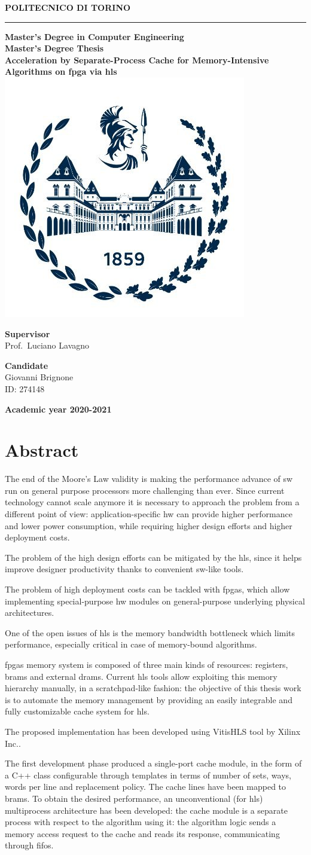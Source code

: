 \documentclass[11pt,a4paper,oneside]{memoir}
\renewcommand*{\maketitle}%
{
	\newgeometry{left=2cm,right=2cm,top=3cm,bottom=3.5cm}

	\begin{center}
		\begingroup
		{\Huge\textbf{POLITECNICO DI TORINO}}\\[\baselineskip]
		\rule{\textwidth}{2pt}\par
		\vspace*{1em}
		{\LARGE\textbf{Master's Degree in Computer Engineering}}\\[\baselineskip]
		\vspace*{1em}
		{\Large\textbf{Master's Degree Thesis}}\\
		\vspace*{2cm}
		{\huge\textbf{Acceleration by Separate-Process Cache for
		Memory-Intensive Algorithms on \acs{fpga} via \acl{hls}}}\\
		\vspace*{1cm}
		\includegraphics[width=.3\textwidth]{figures/polito-logo}
	\end{center}
	\vfill
	\begin{minipage}{0.4\textwidth}
		\begin{flushleft}
			{\Large
				\textbf{Supervisor}\\
				Prof.\ Luciano Lavagno
			}
		\end{flushleft}
	\end{minipage}
	\begin{minipage}{0.4\textwidth}
		\begin{flushright} 
			{\Large
				\textbf{Candidate}\\
				Giovanni Brignone\\
				ID: 274148
			}
		\end{flushright}
	\end{minipage}  
	\vspace*{2cm}
	\begin{center}
		{\Large\textbf{Academic year 2020-2021}}
	\end{center}
	\endgroup

	\restoregeometry 
}
\begin{document}
\pagestyle{empty}
\maketitle

\clearpage
\pagestyle{plain}

\frontmatter
\chapter*{Abstract}
The end of the Moore's Law validity is making the performance advance of
\acl{sw} run on general purpose processors more challenging than ever.
Since current technology cannot scale anymore it is necessary to approach the
problem from a different point of view: application-specific \acl{hw} can
provide higher performance and lower power consumption, while requiring higher
design efforts and higher deployment costs.

The problem of the high design efforts can be mitigated by the \acf{hls}, since
it helps improve designer productivity thanks to convenient \acl{sw}-like
tools.

The problem of high deployment costs can be tackled with \acp{fpga}, which allow
implementing special-purpose \acl{hw} modules on general-purpose underlying
physical architectures.

\bigskip
One of the open issues of \ac{hls} is the memory bandwidth bottleneck which
limits performance, especially critical in case of memory-bound algorithms.

\acp{fpga} memory system is composed of three main kinds of resources: registers,
\aclp{bram} and external \acsp{dram}.
Current \ac{hls} tools allow exploiting this memory hierarchy manually, in a
scratchpad-like fashion: the objective of this thesis work is to automate the
memory management by providing an easily integrable and fully customizable cache
system for \ac{hls}.

\bigskip
The proposed implementation has been developed using Vitis\texttrademark HLS
tool by Xilinx Inc..

The first development phase produced a single-port cache module, in the form of
a C++ class configurable through templates in terms of number of sets, ways,
words per line and replacement policy.
The cache lines have been mapped to \acp{bram}.
To obtain the desired performance, an unconventional (for \ac{hls}) multiprocess
architecture has been developed: the cache module is a separate process with
respect to the algorithm using it: the algorithm logic sends a memory access
request to the cache and reads its response, communicating through \acsp{fifo}.
\end{document}
